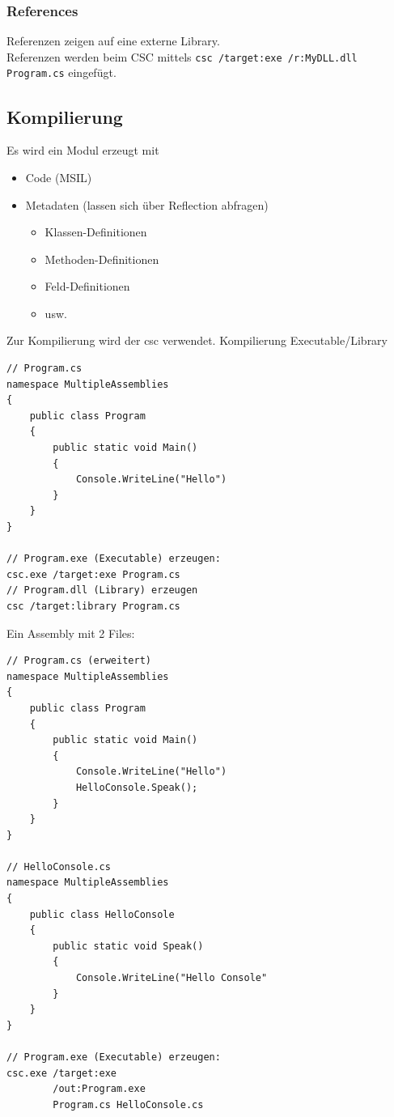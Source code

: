 \documentclass[
a4paper,
oneside,
10pt,
fleqn,
headsepline,
toc=listofnumbered, 
bibliography=totocnumbered]{scrartcl}
\begin{document}
\subsubsection{References}
Referenzen zeigen auf eine externe Library. \\
Referenzen werden beim CSC mittels \lstinline|csc /target:exe /r:MyDLL.dll Program.cs| eingefügt.


\clearpage

\subsection{Kompilierung}
Es wird ein Modul erzeugt mit
\begin{itemize}
    \item Code (MSIL)
    \item Metadaten (lassen sich über Reflection abfragen)
    \begin{itemize}
        \item Klassen-Definitionen
        \item Methoden-Definitionen
        \item Feld-Definitionen
        \item usw.
    \end{itemize}
\end{itemize}

Zur Kompilierung wird der \gls{csc} verwendet.
Kompilierung Executable/Library
\begin{lstlisting}
// Program.cs
namespace MultipleAssemblies
{
    public class Program
    {
        public static void Main()
        {
            Console.WriteLine("Hello")
        }
    }
}

// Program.exe (Executable) erzeugen:
csc.exe /target:exe Program.cs
// Program.dll (Library) erzeugen
csc /target:library Program.cs
\end{lstlisting}

Ein Assembly mit 2 Files:
\begin{lstlisting}
// Program.cs (erweitert)
namespace MultipleAssemblies
{
    public class Program
    {
        public static void Main()
        {
            Console.WriteLine("Hello")
            HelloConsole.Speak();
        }
    }
}

// HelloConsole.cs
namespace MultipleAssemblies
{
    public class HelloConsole
    {
        public static void Speak()
        {
            Console.WriteLine("Hello Console"
        }
    }
}

// Program.exe (Executable) erzeugen:
csc.exe /target:exe
        /out:Program.exe
        Program.cs HelloConsole.cs
\end{lstlisting}
\end{document}
